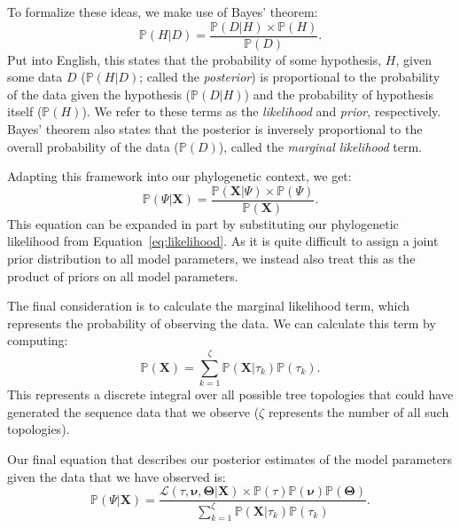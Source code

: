 To formalize these ideas, we make use of Bayes' theorem:
\begin{equation}
  \mathbb{P}(H|D) = \frac{\mathbb{P}(D|H) \times \mathbb{P}(H)}{\mathbb{P}(D)}.
\end{equation}
Put into English, this states that the probability of some hypothesis, $H$, given some data $D$ ($\mathbb{P}(H|D)$; called the \textit{posterior}) is proportional to the probability of the data given the hypothesis ($\mathbb{P}(D|H)$) and the probability of hypothesis itself ($\mathbb{P}(H)$).
We refer to these terms as the \textit{likelihood} and \textit{prior}, respectively.
Bayes' theorem also states that the posterior is inversely proportional to the overall probability of the data ($\mathbb{P}(D)$), called the \textit{marginal likelihood} term.

Adapting this framework into our phylogenetic context, we get:
\begin{equation}
  \mathbb{P}(\Psi|\mathbf{X}) = \frac{\mathbb{P}(\mathbf{X}|\Psi) \times \mathbb{P}(\Psi)}{\mathbb{P}(\mathbf{X})}.
\end{equation}
This equation can be expanded in part by substituting our phylogenetic likelihood from Equation~\ref{eq:likelihood}.
As it is quite difficult to assign a joint prior distribution to all model parameters, we instead also treat this as the product of priors on all model parameters.

The final consideration is to calculate the marginal likelihood term, which represents the probability of observing the data.
We can calculate this term by computing:
\begin{equation}
  \label{eq:marginalTerm}
  \mathbb{P}(\mathbf{X}) = \sum_{k=1}^{\zeta} \mathbb{P}(\mathbf{X}|\tau_k)\mathbb{P}(\tau_k).
\end{equation}
This represents a discrete integral over all possible tree topologies that could have generated the sequence data that we observe ($\zeta$ represents the number of all such topologies).

Our final equation that describes our posterior estimates of the model parameters given the data that we have observed is:
\begin{equation}
  \label{eq:posteriorLikelihood}
  \mathbb{P}(\Psi|\mathbf{X}) = 
    \frac{\mathcal{L}(\tau,\mathbf{\nu},\mathbf{\Theta}|\mathbf{X}) \times \mathbb{P}(\tau)\mathbb{P}(\mathbf{\nu})\mathbb{P}(\mathbf{\Theta})}
    {\sum_{k=1}^{\zeta} \mathbb{P}(\mathbf{X}|\tau_k)\mathbb{P}(\tau_k)}.
\end{equation}

